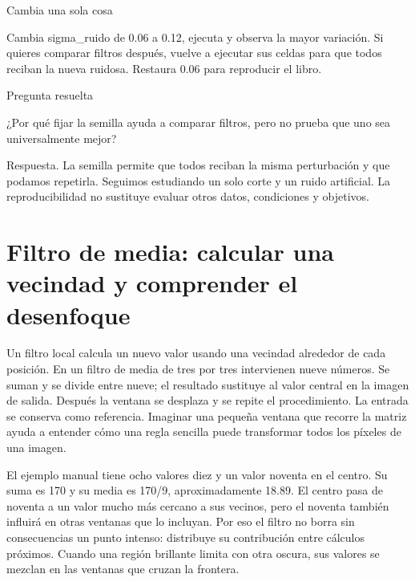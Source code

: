 
\begin{Practica}{Cambia una sola cosa}

Cambia sigma\_ruido de 0.06 a 0.12, ejecuta y observa la mayor variación. Si quieres comparar filtros después, vuelve a ejecutar sus celdas para que todos reciban la nueva ruidosa. Restaura 0.06 para reproducir el libro.


\end{Practica}


\begin{Idea}{Pregunta resuelta}

¿Por qué fijar la semilla ayuda a comparar filtros, pero no prueba que uno sea universalmente mejor?


Respuesta. La semilla permite que todos reciban la misma perturbación y que podamos repetirla. Seguimos estudiando un solo corte y un ruido artificial. La reproducibilidad no sustituye evaluar otros datos, condiciones y objetivos.


\end{Idea}

\clearpage

\section{Filtro de media: calcular una vecindad y comprender el desenfoque}


Un filtro local calcula un nuevo valor usando una vecindad alrededor de cada posición. En un filtro de media de tres por tres intervienen nueve números. Se suman y se divide entre nueve; el resultado sustituye al valor central en la imagen de salida. Después la ventana se desplaza y se repite el procedimiento. La entrada se conserva como referencia. Imaginar una pequeña ventana que recorre la matriz ayuda a entender cómo una regla sencilla puede transformar todos los píxeles de una imagen.


El ejemplo manual tiene ocho valores diez y un valor noventa en el centro. Su suma es 170 y su media es 170/9, aproximadamente 18.89. El centro pasa de noventa a un valor mucho más cercano a sus vecinos, pero el noventa también influirá en otras ventanas que lo incluyan. Por eso el filtro no borra sin consecuencias un punto intenso: distribuye su contribución entre cálculos próximos. Cuando una región brillante limita con otra oscura, sus valores se mezclan en las ventanas que cruzan la frontera.


